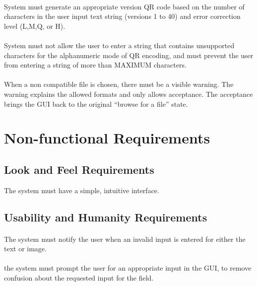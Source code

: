 \documentclass[12pt, titlepage]{article}
\begin{document}
	\paragraph{}
	System must generate an appropriate version QR code based on the number of 
	characters in the user input text string (versions 1 to 40) and error 
	correction level (L,M,Q, or H).
	\paragraph{}
	System must not allow the user to enter a string that contains unsupported 
	characters for the alphanumeric mode of QR encoding, and must prevent the 
	user from entering a string of more than MAXIMUM characters.
	\paragraph{}	
	When a non compatible file is chosen, there must be a visible warning. The 
	warning explains the allowed formats and only allows acceptance. The 
	acceptance brings the GUI back to the original “browse for a file” state.
	
	

\section{Non-functional Requirements}

\subsection{Look and Feel Requirements}
	
	The system must have a simple, intuitive interface.
	
	
\subsection{Usability and Humanity Requirements}

\paragraph{}
	The system must notify the user when an invalid input is entered for either 
	the text or image.
	\paragraph{}
	the system must prompt the user for an appropriate input in the GUI, to 
	remove confusion about the requested input for the field.
\end{document}
